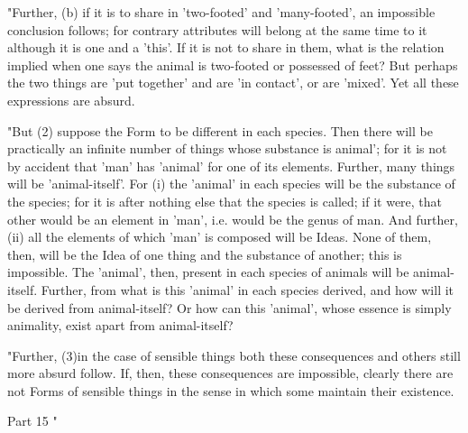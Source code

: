 "Further, (b) if it is to share in 'two-footed' and 'many-footed',
an impossible conclusion follows; for contrary attributes will belong
at the same time to it although it is one and a 'this'. If it is not
to share in them, what is the relation implied when one says the animal
is two-footed or possessed of feet? But perhaps the two things are
'put together' and are 'in contact', or are 'mixed'. Yet all these
expressions are absurd. 

"But (2) suppose the Form to be different in each species. Then there
will be practically an infinite number of things whose substance is
animal'; for it is not by accident that 'man' has 'animal' for one
of its elements. Further, many things will be 'animal-itself'. For
(i) the 'animal' in each species will be the substance of the species;
for it is after nothing else that the species is called; if it were,
that other would be an element in 'man', i.e. would be the genus of
man. And further, (ii) all the elements of which 'man' is composed
will be Ideas. None of them, then, will be the Idea of one thing and
the substance of another; this is impossible. The 'animal', then,
present in each species of animals will be animal-itself. Further,
from what is this 'animal' in each species derived, and how will it
be derived from animal-itself? Or how can this 'animal', whose essence
is simply animality, exist apart from animal-itself? 

"Further, (3)in the case of sensible things both these consequences
and others still more absurd follow. If, then, these consequences
are impossible, clearly there are not Forms of sensible things in
the sense in which some maintain their existence. 

Part 15 "


